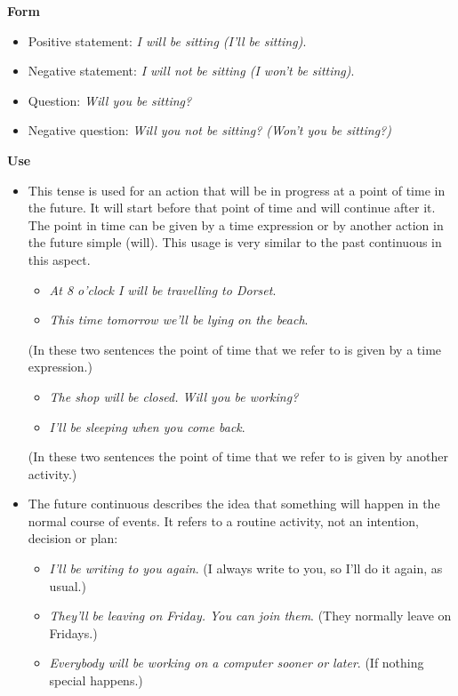 \begin{itemize}
\textbf{Form}

\begin{itemize}

\item Positive statement: \textit{I will be sitting (I'll be sitting)}.
\item Negative statement: \textit{ I will not be sitting (I won't be sitting)}.
\item Question: \textit{Will you be sitting?}
\item Negative question: \textit{Will you not be sitting? (Won't you be sitting?)}

\end{itemize}

\textbf{Use}

\begin{itemize}

\item This tense is used for an action that will be in progress at a point of time in the future. It will start before that point of time and will continue after it. The point in time can be given by a time expression or by another action in the future simple (will). This usage is very similar to the past continuous in this aspect.

\begin{itemize}
\item \textit{At 8 o'clock I will be travelling to Dorset}.
\item \textit{This time tomorrow we'll be lying on the beach}.
\end{itemize}

(In these two sentences the point of time that we refer to is given by a time expression.)

\begin{itemize}
\item \textit{The shop will be closed. Will you be working?}
\item \textit{I'll be sleeping when you come back}.
\end{itemize}

(In these two sentences the point of time that we refer to is given by another activity.) 

\item The future continuous describes the idea that something will happen in the normal course of events. It refers to a routine activity, not an intention, decision or plan:

\begin{itemize}
\item \textit{I'll be writing to you again}. (I always write to you, so I'll do it again, as usual.) 
\item \textit{They'll be leaving on Friday. You can join them}. (They normally leave on Fridays.) 
\item \textit{Everybody will be working on a computer sooner or later}. (If nothing special happens.)
\end{itemize}


\end{itemize}
\end{itemize}
